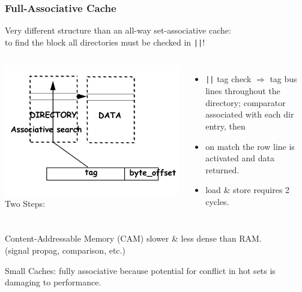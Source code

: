 \documentclass{beamer}
\renewcommand{\emph}[1]{\textcolor{structure}{#1}}
\newcommand{\emp}[1]{\textcolor{DikuRed}{ #1}}
\begin{document}
\begin{frame}[fragile,t]
\frametitle{Full-Associative Cache}
 
Very different structure than an all-way set-associative cache:\\
to find the block all directories must be checked in {\tt ||}!

\begin{columns}
\includegraphics[width=33ex]{FigsMemH/FullAssoc}\pause
{}
Two Steps:
\begin{itemize}
    \item \emp{{\tt||} tag check} $\Rightarrow$ tag bus lines throughout the directory; 
            comparator associated with each dir entry, then
    \item  \emph{on match} the row line is activated and data returned.
    \item \emp{load \& store requires 2 cycles.}
\end  {itemize} 
\end{columns}
\medskip

Content-Addressable Memory (CAM) \emp{slower \& less dense} than RAM.\\
(signal propag, comparison, etc.)\bigskip

Small Caches: fully associative because potential for conflict in hot sets
    is damaging to performance. 

\end{frame}
\end{document}
